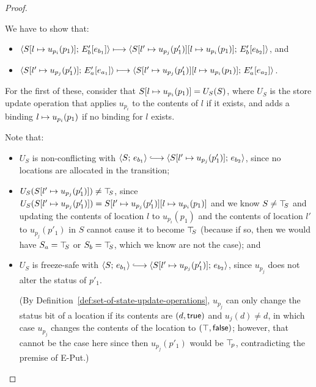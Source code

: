 \begin{proof}
\begin{enumerate}
\begin{enumerate}
\begin{itemize}
        We have to show that:
        \begin{itemize}
        \item
          $\langle S[l \mapsto u_{p_i}(p_1)];\, E'_b\hspace{-0.5mm}\left[e_{b_1}\right] \rangle
          \longmapsto
          \langle S[l' \mapsto u_{p_j}(p'_1)][l \mapsto u_{p_i}(p_1)];\, E'_b\hspace{-0.5mm}\left[e_{b_2}\right] \rangle$,
          and
        \item
          $\langle S[l' \mapsto u_{p_j}(p'_1)];\, E'_a\hspace{-0.5mm}\left[e_{a_1}\right] \rangle
          \longmapsto
          \langle S[l' \mapsto u_{p_j}(p'_1)][l \mapsto u_{p_i}(p_1)];\, E'_a\hspace{-0.5mm}\left[e_{a_2}\right] \rangle$.
        \end{itemize}

        For the first of these, consider that
        $S[l \mapsto u_{p_i}(p_1)] = U_S(S)$, where $U_S$ is the
        store update operation that applies $u_{p_i}$ to the
        contents of $l$ if it exists, and adds a binding
        $l \mapsto u_{p_i}(p_1)$ if no binding for $l$
        exists.

        Note that:
        \begin{itemize}
        \item $U_S$ is non-conflicting with $\config{S}{e_{b_1}}
          \parstepsto
          \config{\extSRaw{S}{l'}{u_{p_j}(p'_1)}}{e_{b_2}}$, since
          no locations are allocated in the transition;
        \item $U_S(S[l' \mapsto u_{p_j}(p'_1)]) \neq \top\hspace{-0.85mm}_{S}$,
          since $U_S(S[l' \mapsto u_{p_j}(p'_1)]) =
          S[l' \mapsto u_{p_j}(p'_1)][l \mapsto u_{p_i}(p_1)]$
          and we know $S \neq \top\hspace{-0.85mm}_{S}$ and updating the contents of
          location $l$ to $u_{p_i}(p_1)$ and the contents of
          location $l'$ to $u_{p_j}(p'_1)$ in $S$ cannot cause it to
          become $\top\hspace{-0.85mm}_{S}$ (because if so, then we would have $S_a =
          \top\hspace{-0.85mm}_{S}$ or $S_b = \top\hspace{-0.85mm}_{S}$, which we know are not the case);
          and
        \item $U_S$ is freeze-safe with $\config{S}{e_{b_1}}
          \parstepsto
          \config{\extSRaw{S}{l'}{u_{p_j}(p'_1)}}{e_{b_2}}$, since
          $u_{p_j}$ does not alter the status of $p'_1$.

          (By Definition~\ref{def:set-of-state-update-operations},
          $u_{p_j}$ can only change the status bit of a location if
          its contents are $(d, \textsf{true})$ and $u_j(d) \neq
          d$, in which case $u_{p_j}$ changes the contents of the
          location to $(\top, \textsf{false})$; however, that
          cannot be the case here since then $u_{p_j}(p'_1)$ would be
          $\top\hspace{-0.85mm}_{p}$, contradicting the premise of {\sc E-Put}.)
        \end{itemize}


\end{itemize}
\end{enumerate}
\end{enumerate}
\end{proof}
